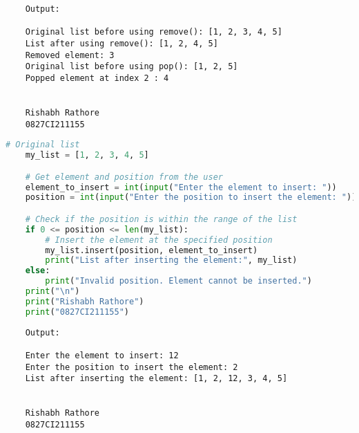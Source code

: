\documentclass{report}
\begin{document}
\begin{verbatim}
	Output:

	Original list before using remove(): [1, 2, 3, 4, 5]
	List after using remove(): [1, 2, 4, 5]
	Removed element: 3
	Original list before using pop(): [1, 2, 5]
	Popped element at index 2 : 4
	
	
	Rishabh Rathore
	0827CI211155
\end{verbatim}
\bigskip


\sol{}
\begin{lstlisting}[language=Python]
	# Original list
	my_list = [1, 2, 3, 4, 5]

	# Get element and position from the user
	element_to_insert = int(input("Enter the element to insert: "))
	position = int(input("Enter the position to insert the element: "))

	# Check if the position is within the range of the list
	if 0 <= position <= len(my_list):
		# Insert the element at the specified position
		my_list.insert(position, element_to_insert)
		print("List after inserting the element:", my_list)
	else:
		print("Invalid position. Element cannot be inserted.")
	print("\n")
	print("Rishabh Rathore")
	print("0827CI211155")
\end{lstlisting}

\begin{verbatim}
	Output:

	Enter the element to insert: 12
	Enter the position to insert the element: 2
	List after inserting the element: [1, 2, 12, 3, 4, 5]
	
	
	Rishabh Rathore
	0827CI211155
\end{verbatim}
\bigskip
\end{document}
